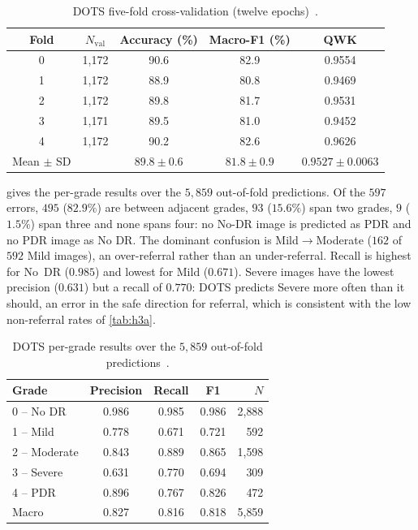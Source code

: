 \begin{table}[!htbp]
\centering
\caption[DOTS five-fold cross-validation]{DOTS five-fold cross-validation (twelve
epochs)~\cite{belhadj2026dots}.}
\label{tab:dots-cv}
\small
\begin{tabular}{@{}ccccc@{}}
\toprule
Fold & $N_{\mathrm{val}}$ & Accuracy (\%) & Macro-F1 (\%) & QWK \\
\midrule
0 & 1{,}172 & 90.6 & 82.9 & 0.9554 \\
1 & 1{,}172 & 88.9 & 80.8 & 0.9469 \\
2 & 1{,}172 & 89.8 & 81.7 & 0.9531 \\
3 & 1{,}171 & 89.5 & 81.0 & 0.9452 \\
4 & 1{,}172 & 90.2 & 82.6 & 0.9626 \\
\midrule
Mean $\pm$ SD & & $89.8\pm0.6$ & $81.8\pm0.9$ & $0.9527\pm0.0063$ \\
\bottomrule
\end{tabular}
\end{table}

 gives the per-grade results over the $5{,}859$ out-of-fold
predictions. Of the $597$ errors, $495$ ($82.9\%$) are between adjacent grades, $93$
($15.6\%$) span two grades, $9$ ($1.5\%$) span three and none spans four: no No-DR image is
predicted as PDR and no PDR image as No DR. The dominant confusion is Mild$\to$Moderate
($162$ of $592$ Mild images), an over-referral rather than an under-referral.
Recall is highest for No~DR ($0.985$) and lowest for Mild ($0.671$). Severe images have
the lowest precision ($0.631$) but a recall of $0.770$: DOTS predicts Severe more often than
it should, an error in the safe direction for referral, which is consistent with the low
non-referral rates of \cref{tab:h3a}.

\begin{table}[H]
\centering
\caption[DOTS per-grade results]{DOTS per-grade results over the $5{,}859$ out-of-fold
predictions~\cite{belhadj2026dots}.}
\label{tab:dots-grade}
\small
\begin{tabular}{@{}lcccr@{}}
\toprule
Grade & Precision & Recall & F1 & $N$ \\
\midrule
0 -- No DR & 0.986 & 0.985 & 0.986 & 2{,}888 \\
1 -- Mild & 0.778 & 0.671 & 0.721 & 592 \\
2 -- Moderate & 0.843 & 0.889 & 0.865 & 1{,}598 \\
3 -- Severe & 0.631 & 0.770 & 0.694 & 309 \\
4 -- PDR & 0.896 & 0.767 & 0.826 & 472 \\
\midrule
Macro & 0.827 & 0.816 & 0.818 & 5{,}859 \\
\bottomrule
\end{tabular}
\end{table}

